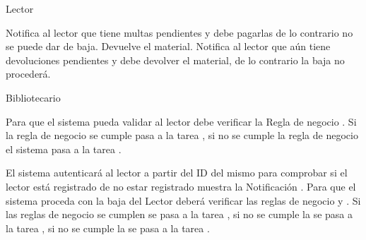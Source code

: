\begin{PDescripcion}

  \Ppaso Lector

    \begin{enumerate}

      \Ppaso[\itarea] Notifica al lector que tiene multas pendientes y debe pagarlas de lo contrario no se puede dar de baja.
      \Ppaso[\itarea] Devuelve el material. Notifica al lector que aún tiene devoluciones pendientes y debe devolver el material, de lo contrario la baja no procederá.

    \end{enumerate}

  \Ppaso Bibliotecario

    \begin{enumerate}

      \Ppaso[\itarea]  Para que el sistema pueda validar al lector debe verificar la Regla de negocio . Si la regla de negocio se cumple pasa a la tarea , si no se cumple la regla de negocio el sistema pasa a la tarea .



      \Ppaso[\itarea]  El sistema autenticará al lector a partir del ID del mismo para comprobar si el lector está registrado de no estar registrado muestra la Notificación .
      \Ppaso[\itarea] Para que el sistema proceda con la baja del Lector deberá verificar las reglas de negocio  y . Si las reglas de negocio se cumplen se pasa a la tarea , si no se cumple la  se pasa a la tarea , si no se cumple la  se pasa a la tarea .


\end{enumerate}
\end{PDescripcion}
